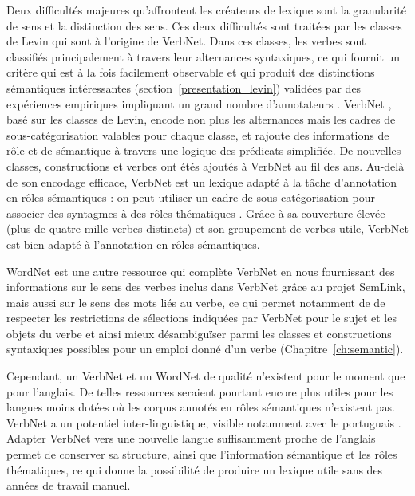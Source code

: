 Deux difficultés majeures qu'affrontent les créateurs de lexique sont la
granularité de sens et la distinction des sens. Ces deux difficultés sont
traitées par les classes de Levin \citep{levin1993english} qui sont à l'origine
de VerbNet. Dans ces classes, les verbes sont classifiés principalement à
travers leur alternances syntaxiques, ce qui fournit un critère qui est à la
fois facilement observable et qui produit des distinctions sémantiques
intéressantes (section~\ref{presentation_levin}) validées par des expériences
empiriques impliquant un grand nombre d'annotateurs
\citep{hartshorne2014verbcorner}.  VerbNet \citep{kipperschuler2005verbnet},
basé sur les classes de Levin, encode non plus les alternances mais les cadres
de sous-catégorisation valables pour chaque classe, et rajoute des informations
de rôle et de sémantique à travers une logique des prédicats simplifiée. De
nouvelles classes, constructions et verbes ont étés ajoutés à VerbNet au fil
des ans. Au-delà de son encodage efficace, VerbNet est un lexique adapté à la
tâche d'annotation en rôles sémantiques : on peut utiliser un cadre de
sous-catégorisation pour associer des syntagmes à des rôles thématiques
\citep{swier2005exploiting,pradet2013revisiting}. Grâce à sa couverture élevée
(plus de quatre mille verbes distincts) et son groupement de verbes utile,
VerbNet est bien adapté à l'annotation en rôles sémantiques.


WordNet est une autre ressource qui complète VerbNet en nous fournissant des
informations sur le sens des verbes inclus dans VerbNet grâce au projet
SemLink, mais aussi sur le sens des mots liés au verbe, ce qui permet notamment
de de respecter les restrictions de sélections indiquées par VerbNet pour le
sujet et les objets du verbe et ainsi mieux désambiguïser parmi les classes et
constructions syntaxiques possibles pour un emploi donné d'un verbe
(Chapitre~\ref{ch:semantic}).


Cependant, un VerbNet et un WordNet de qualité n'existent pour le moment que
pour l'anglais. De telles ressources seraient pourtant encore plus utiles pour
les langues moins dotées où les corpus annotés en rôles sémantiques n'existent
pas. VerbNet a un potentiel inter-linguistique, visible notamment avec le
portuguais \citep[section 2.2.2]{kipperschuler2005verbnet}. Adapter VerbNet
vers une nouvelle langue suffisamment proche de l'anglais permet de conserver
sa structure, ainsi que l'information sémantique et les rôles thématiques, ce
qui donne la possibilité de produire un lexique utile sans des années de
travail manuel.

